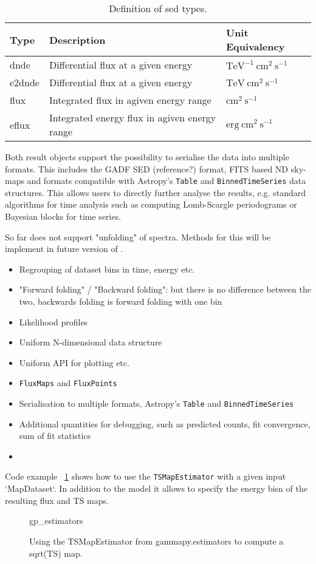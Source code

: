 \begin{table*}
    \begin{center}
        \begin{tabular}{lll}
         \hline
         Type & Description & Unit Equivalency \\
         \hline
         dnde & Differential flux at a given energy & $\mathrm{TeV^{-1}~cm^{2}~s^{-1}}$ \\
         e2dnde & Differential flux at a given energy  & $\mathrm{TeV~cm^{2}~s^{-1}}$ \\
         flux & Integrated flux in agiven energy range & $\mathrm{cm^{2}~s^{-1}}$ \\
         eflux & Integrated energy flux in agiven energy range & $\mathrm{erg~cm^{2}~s^{-1}}$
        \end{tabular}
    \end{center}
    \label{tab:sed_types}
    \caption{Definition of sed types.}
\end{table*}


Both result objects support the possibility to serialise
the data into multiple formats. This includes the
GADF SED (reference?) format, FITS based ND sky-maps
and formats compatible with Astropy's \verb|Table| and
\verb|BinnedTimeSeries| data structures. This allows
users to directly further analyse the results, e.g.
standard algorithms for time analysis such as
computing Lomb-Scargle periodograms or Bayesian
blocks for time series.

So far \gammapy does not support "unfolding" of \gammaray spectra.
Methods for this will be implement in future version of \gammapy.

\begin{itemize}
	\item Regrouping of dataset bins in time, energy etc.
	\item "Forward folding" / "Backward folding": but there is no
	      difference between the two, backwards folding is forward folding with one bin
	\item Likelihood profiles \item Uniform N-dimensional data structure \item
	      Uniform API for plotting etc. \item \verb|FluxMaps| and \verb|FluxPoints| \item
	      Serialisation to multiple formats, Astropy's \verb|Table| and
	      \verb|BinnedTimeSeries|
	\item Additional quantities for debugging, such as predicted counts, fit convergence,
	      sum of fit statistics \item \end{itemize}

Code example ~\ref{fig*:minted:gp_estimators} shows how to use
the \verb|TSMapEstimator| with a given input `MapDataset`.
In addition to the model it allows to specify the energy
bisn of the resulting flux and TS maps.

\begin{figure}
	{gp_estimators}
	\caption{Using the TSMapEstimator from gammapy.estimators to compute a
		sqrt(TS) map.} \label{fig*:minted:gp_estimators} \end{figure}
